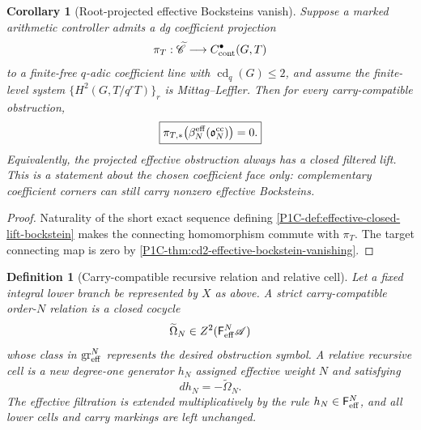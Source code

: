 \documentclass[11pt]{article}
\newtheorem{corollary}[theorem]{Corollary}
\newtheorem{definition}[theorem]{Definition}
\theoremstyle{remark}
\begin{document}
\begin{corollary}[Root-projected effective Bocksteins vanish]
\label{P1C-cor:root-projected-effective-bockstein-zero}
Suppose a marked arithmetic controller admits a dg coefficient projection
\[
 \pi_T:\widetilde{\mathscr C}\longrightarrow C^\bullet_{\rm cont}(G,T)
\]
to a finite-free $q$-adic coefficient line with $\operatorname{cd}_q(G)\le2$, and assume the finite-level system $\{H^2(G,T/q^rT)\}_r$ is Mittag--Leffler.  Then for every
carry-compatible obstruction,
\[
 \boxed{
 \pi_{T,*}\!\left(
 \beta_N^{\rm eff}(\mathfrak o_N^{\rm cc})
 \right)=0.}
\]
Equivalently, the projected effective obstruction always has a closed filtered lift.  This is a
statement about the chosen coefficient face only: complementary coefficient corners can still carry
nonzero effective Bocksteins.
\end{corollary}

\begin{proof}
Naturality of the short exact sequence defining \cref{P1C-def:effective-closed-lift-bockstein} makes the
connecting homomorphism commute with $\pi_T$.  The target connecting map is zero by
\cref{P1C-thm:cd2-effective-bockstein-vanishing}.
\end{proof}

\begin{definition}[Carry-compatible recursive relation and relative cell]
\label{P1C-def:carry-compatible-recursive-cell}
Let a fixed integral lower branch be represented by $X$ as above.  A \emph{strict carry-compatible
order-$N$ relation} is a closed cocycle
\[
 \widetilde\Omega_N\in
 Z^2(\mathsf F_{\rm eff}^{N}\mathscr A)
\]
whose class in $\operatorname{gr}^{N}_{\rm eff}$ represents the desired obstruction symbol.  A
\emph{relative recursive cell} is a new degree-one generator $h_N$ assigned effective weight $N$ and
satisfying
\[
 \boxed{dh_N=-\widetilde\Omega_N.}
\]
The effective filtration is extended multiplicatively by the rule
$h_N\in\mathsf F_{\rm eff}^{N}$, and all lower cells and carry markings are left unchanged.
\end{definition}
\end{document}
